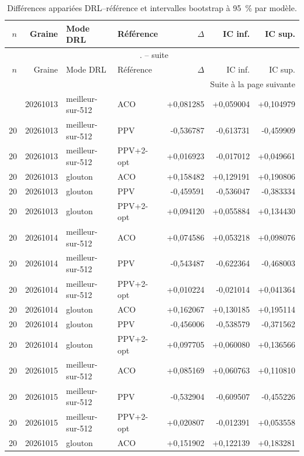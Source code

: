 \documentclass[12pt, a4paper, twoside, openright]{book}
\renewcommand{\thetable}        {\arabic{chapter}.\arabic{table}}
\begin{document}
\scriptsize
\begin{longtable}{r r l l r r r}
\caption{Différences appariées DRL--référence et intervalles bootstrap à 95~\% par modèle.}\label{tab:multiseed-paired-bootstrap}\\
\toprule
$n$ & Graine & Mode DRL & Référence & $\Delta$ & IC inf. & IC sup. \\
\midrule
\endfirsthead
\multicolumn{7}{c}{\tablename\ \thetable{} -- suite}\\
\toprule
$n$ & Graine & Mode DRL & Référence & $\Delta$ & IC inf. & IC sup. \\
\midrule
\endhead
\midrule
\multicolumn{7}{r}{Suite à la page suivante}\\
\endfoot
\bottomrule
\endlastfoot
20 & 20261013 & meilleur-sur-512 & ACO & +0,081285 & +0,059004 & +0,104979 \\
20 & 20261013 & meilleur-sur-512 & PPV & -0,536787 & -0,613731 & -0,459909 \\
20 & 20261013 & meilleur-sur-512 & PPV+2-opt & +0,016923 & -0,017012 & +0,049661 \\
20 & 20261013 & glouton & ACO & +0,158482 & +0,129191 & +0,190806 \\
20 & 20261013 & glouton & PPV & -0,459591 & -0,536047 & -0,383334 \\
20 & 20261013 & glouton & PPV+2-opt & +0,094120 & +0,055884 & +0,134430 \\
20 & 20261014 & meilleur-sur-512 & ACO & +0,074586 & +0,053218 & +0,098076 \\
20 & 20261014 & meilleur-sur-512 & PPV & -0,543487 & -0,622364 & -0,468003 \\
20 & 20261014 & meilleur-sur-512 & PPV+2-opt & +0,010224 & -0,021014 & +0,041364 \\
20 & 20261014 & glouton & ACO & +0,162067 & +0,130185 & +0,195114 \\
20 & 20261014 & glouton & PPV & -0,456006 & -0,538579 & -0,371562 \\
20 & 20261014 & glouton & PPV+2-opt & +0,097705 & +0,060080 & +0,136566 \\
20 & 20261015 & meilleur-sur-512 & ACO & +0,085169 & +0,060763 & +0,110810 \\
20 & 20261015 & meilleur-sur-512 & PPV & -0,532904 & -0,609507 & -0,455226 \\
20 & 20261015 & meilleur-sur-512 & PPV+2-opt & +0,020807 & -0,012391 & +0,053558 \\
20 & 20261015 & glouton & ACO & +0,151902 & +0,122139 & +0,183281 \\

\end{longtable}
\end{document}
